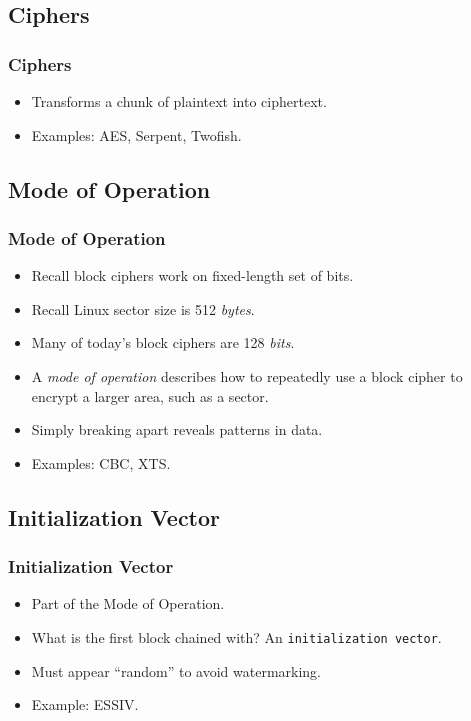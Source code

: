 \documentclass[xcolor={dvipsnames,svgnames},hyperref=dvips]{beamer}
\begin{document}
	\subsection{Ciphers}
	\begin{frame}
		\frametitle{Ciphers}
		\begin{itemize}
		\item Transforms a chunk of plaintext into ciphertext.
		\item Examples: AES, Serpent, Twofish.
		\end{itemize}
	\end{frame}

	\subsection{Mode of Operation}
	\begin{frame}
		\frametitle{Mode of Operation}
		\begin{itemize}
		\item Recall block ciphers work on fixed-length set of bits.
		\item Recall Linux sector size is 512 \textit{bytes}.
		\item Many of today's block ciphers are 128 \textit{bits}.
		\item A \textit{mode of operation} describes how to repeatedly use a block cipher to encrypt a larger area, such as a sector.
		\item Simply breaking apart reveals patterns in data.
		\item Examples: CBC, XTS.
		\end{itemize}
	\end{frame}

	\subsection{Initialization Vector}
	\begin{frame}
		\frametitle{Initialization Vector}
		\begin{itemize}
		\item Part of the Mode of Operation.
		\item What is the first block chained with? An \texttt{initialization vector}.
		\item Must appear ``random'' to avoid watermarking.
		\item Example: ESSIV.
		\end{itemize}
	\end{frame}
\end{document}
